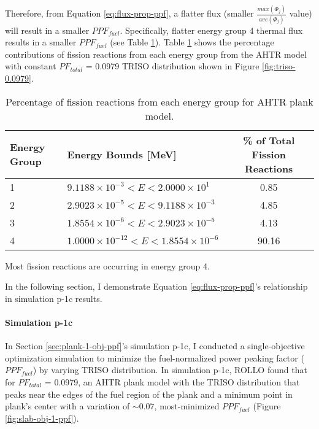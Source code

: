 Therefore, from Equation \ref{eq:flux-prop-ppf}, a flatter flux (smaller 
$\frac{max(\Phi_j)}{ave(\Phi_j)}$ value) will result in a smaller $PPF_{fuel}$. 
Specifically, flatter energy group 4 thermal flux results in a smaller $PPF_{fuel}$
(see Table \ref{tab:fission-flux}). 
Table \ref{tab:fission-flux} shows the percentage contributions of fission reactions from 
each energy group from the \gls{AHTR} model with constant $PF_{total}$ = 0.0979 
TRISO distribution shown in Figure \ref{fig:triso-0.0979}. 
\begin{table}[htbp!]
    \centering
    \onehalfspacing
    \caption{Percentage of fission reactions from each energy group for \gls{AHTR} 
    plank model.}
	\label{tab:fission-flux}
    \footnotesize
    \begin{tabular}{llc}
    \hline 
    \textbf{Energy Group} & \textbf{Energy Bounds [MeV]} 
    & \textbf{\% of Total Fission \newline Reactions} \\
    \hline
    1 & $9.1188\times 10^{-3} < E < 2.0000\times 10^1$ & 0.85 \\ 
    2 & $2.9023\times 10^{-5} < E < 9.1188\times 10^{-3}$ & 4.85 \\
    3 & $1.8554\times 10^{-6} < E < 2.9023\times 10^{-5}$ & 4.13 \\
    4 & $1.0000\times 10^{-12} < E < 1.8554\times 10^{-6}$ & 90.16 \\
    \hline
    \end{tabular}
\end{table}
Most fission reactions are occurring in energy group 4. 

In the following section, I demonstrate Equation \ref{eq:flux-prop-ppf}'s relationship 
in simulation p-1c results. 

\paragraph{Simulation p-1c}
In Section \ref{sec:plank-1-obj-ppf}'s simulation p-1c, I conducted a single-objective 
optimization simulation to minimize the fuel-normalized power peaking factor ($PPF_{fuel}$) 
by varying TRISO distribution. 
In simulation p-1c, \gls{ROLLO} found that for $PF_{total}$ = 0.0979, an \gls{AHTR} 
plank model with the TRISO distribution that peaks near the edges of the fuel region of 
the plank and a minimum point in plank's center with a variation of $\sim0.07$, 
most-minimized $PPF_{fuel}$ (Figure \ref{fig:slab-obj-1-ppf}). 


